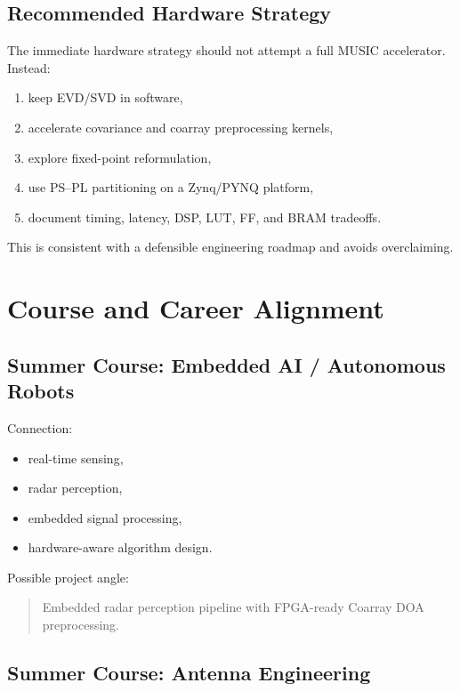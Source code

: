 \documentclass[11pt,letterpaper]{article}
\begin{document}
\subsection{Recommended Hardware Strategy}

The immediate hardware strategy should not attempt a full MUSIC accelerator. Instead:
\begin{enumerate}[leftmargin=*]
    \item keep EVD/SVD in software,
    \item accelerate covariance and coarray preprocessing kernels,
    \item explore fixed-point reformulation,
    \item use PS--PL partitioning on a Zynq/PYNQ platform,
    \item document timing, latency, DSP, LUT, FF, and BRAM tradeoffs.
\end{enumerate}

This is consistent with a defensible engineering roadmap and avoids overclaiming.

\section{Course and Career Alignment}

\subsection{Summer Course: Embedded AI / Autonomous Robots}

Connection:
\begin{itemize}[leftmargin=*]
    \item real-time sensing,
    \item radar perception,
    \item embedded signal processing,
    \item hardware-aware algorithm design.
\end{itemize}

Possible project angle:
\begin{quote}
Embedded radar perception pipeline with FPGA-ready Coarray DOA preprocessing.
\end{quote}

\subsection{Summer Course: Antenna Engineering}
\end{document}
